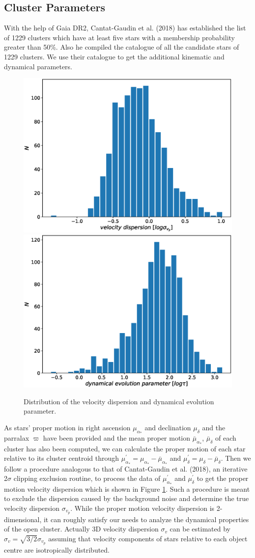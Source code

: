 \documentclass[modern]{aastex63}
\begin{document}
\subsection{Cluster Parameters} 
With the help of Gaia DR2, Cantat-Gaudin et al. (2018) has established the list of 1229 clusters which have at least five stars with a membership probability greater than 50\%. Also he compiled the catalogue of all the candidate stars of 1229 clusters. We use their catalogue to get the additional kinematic and dynamical parameters.
\begin{figure}[t]
\centering
\includegraphics[width=0.49\linewidth]{6.eps}
\includegraphics[width=0.49\linewidth]{7.eps}
\caption{Distribution of the velocity dispersion and dynamical evolution parameter.}
\label{1}
\end{figure}
As stars' proper motion in right ascension $\mu_{\alpha_*}$ and declination $\mu_{\delta}$ and the parralax $\varpi$ have been provided and the mean proper motion $\bar{\mu}_{\alpha_*}$, $\bar{\mu}_{\delta}$ of each cluster has also been computed, we can calculate the proper motion of each star relative to its cluster centroid through $\mu_{\alpha_*}^{\prime}=\mu_{\alpha_*}-\bar{\mu}_{\alpha_*}$ and $\mu_{\delta}^{\prime}=\mu_{\delta}-\bar{\mu}_{\delta}$. Then we follow a procedure analogous to that of Cantat-Gaudin et al. (2018), an iterative 2$\sigma$ clipping exclusion routine, to process the data of $\mu_{\alpha_*}^{\prime}$ and $\mu_{\delta}^{\prime}$ to get the proper motion velocity dispersion which is shown in Figure \ref{1}. Such a procedure is meant to exclude the dispersion caused by the background noise and determine the true velocity dispersion $\sigma_{v_p}$. While the proper motion velocity dispersion is 2-dimensional, it can roughly satisfy our needs to analyze the dynamical properties of the open cluster. Actually 3D velocity dispersion $\sigma_v$ can be estimated by $\sigma_v=\sqrt{3/2}\sigma_{v_p}$ assuming that velocity components of stars relative to each object centre are isotropically distributed.
\end{document}
